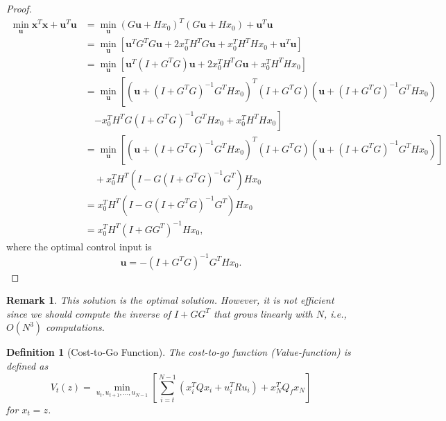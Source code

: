 \documentclass[a4 paper]{article}
\numberwithin{equation}{section}
\theoremstyle{boldStyle}
\newtheorem{remark}{Remark}[section]
\theoremstyle{boldBlueStyle}
\theoremstyle{boldPurpleStyle}
\theoremstyle{boldRedStyle}
\newtheorem{definition}{Definition}[section]
\theoremstyle{boldGreenStyle}
\begin{document}
\begin{proof}
  \begin{align*}
  \min_{\mathbf{u}} \mathbf{x}^T \mathbf{x} + \mathbf{u}^T \mathbf{u} &= \min_{\mathbf{u}} (G\mathbf{u} + H x_0)^T (G\mathbf{u} + H x_0) + \mathbf{u}^T \mathbf{u} \\
  &= \min_{\mathbf{u}} \left[ \mathbf{u}^T G^T G \mathbf{u} + 2 x_0^T H^T G \mathbf{u} + x_0^T H^T H x_0 + \mathbf{u}^T \mathbf{u} \right] \\
  &= \min_{\mathbf{u}} \left[ \mathbf{u}^T (I + G^T G) \mathbf{u} + 2 x_0^T H^T G \mathbf{u} + x_0^T H^T H x_0 \right] \\
  &= \min_{\mathbf{u}} \left[ (\mathbf{u} + (I + G^T G)^{-1} G^T H x_0)^T (I + G^T G) (\mathbf{u} + (I + G^T G)^{-1} G^T H x_0) \right. \\
  & \quad \left. - x_0^T H^T G (I + G^T G)^{-1} G^T H x_0 + x_0^T H^T H x_0 \right] \\
  &= \min_{\mathbf{u}} \left[ (\mathbf{u} + (I + G^T G)^{-1} G^T H x_0)^T (I + G^T G) (\mathbf{u} + (I + G^T G)^{-1} G^T H x_0) \right] \\
  & \quad + x_0^T H^T (I - G (I + G^T G)^{-1} G^T) H x_0 \\
  &= x_0^T H^T (I - G (I + G^T G)^{-1} G^T) H x_0 \\
  &= x_0^T H^T (I + G G^T)^{-1} H x_0,
  \end{align*}
  where the optimal control input is
  \[
  \mathbf{u} = -(I + G^T G)^{-1} G^T H x_0.
  \]
\end{proof}
      
  
\begin{remark}
  This solution is the optimal solution. However, it is not efficient since we should compute the inverse of
  \( I + G G^T \) that grows linearly with \( N \), i.e., \( O(N^3) \) computations. 
\end{remark}
  
\begin{definition}[Cost-to-Go Function]
The cost-to-go function (Value-function) is defined as
\[
V_t(z) = \min_{u_t, u_{t+1}, \ldots, u_{N-1}} \left[ \sum_{i=t}^{N-1} (x_i^T Q x_i + u_i^T R u_i) + x_N^T Q_f x_N \right]
\]
for \( x_t = z \).
\end{definition}
\end{document}
